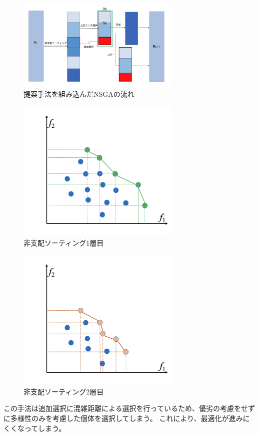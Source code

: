 \documentclass[10pt, a4paper, titlepage]{jarticle}
\begin{document}
\begin{figure}[h]
\begin{center}
\includegraphics[width=0.7\textwidth]{NSGA2.png}
\end{center}
\label{NSGA2}
\caption{
提案手法を組み込んだNSGAの流れ
}
\end{figure}
\begin{figure}[h]
\begin{center}
\includegraphics[width=0.7\textwidth]{dominatedsort1.png}
\end{center}
\label{dominatedsort1}
\caption{
非支配ソーティング1層目
}
\end{figure}
\begin{figure}[h]
\begin{center}
\includegraphics[width=0.7\textwidth]{dominatedsort2.png}
\end{center}
\label{dominatedsort2}
\caption{
非支配ソーティング2層目
}
\end{figure}
この手法は追加選択に混雑距離による選択を行っているため、優劣の考慮をせずに多様性のみを考慮した個体を選択してしまう。
これにより、最適化が進みにくくなってしまう。
\end{document}
